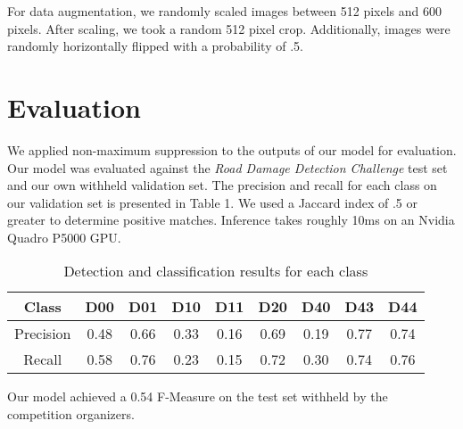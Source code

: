 \documentclass[conference]{IEEEtran}
\begin{document}
For data augmentation, we randomly scaled images between 512 pixels and 600 pixels. After scaling, we took a random 512 pixel crop. Additionally, images were randomly horizontally flipped with a probability of .5.

\section{Evaluation}
We applied non-maximum suppression to the outputs of our model for evaluation. Our model was evaluated against the \textit{Road Damage Detection Challenge} test set and our own withheld validation set. The precision and recall for each class on our validation set is presented in Table 1. We used a Jaccard index of .5 or greater to determine positive matches. Inference takes roughly 10ms on an Nvidia Quadro P5000 GPU.

\begin{table}
\caption{Detection and classification results for each class}
\centering
\begin{tabular}{ccccccccc}
\hline
\textbf{Class} & \textbf{D00} & \textbf{D01} & \textbf{D10} & \textbf{D11} & \textbf{D20} & \textbf{D40} & \textbf{D43} & \textbf{D44} \\
\hline
Precision & 0.48 & 0.66 & 0.33 & 0.16 & 0.69 & 0.19 & 0.77 & 0.74 \\
Recall 	  & 0.58 & 0.76 & 0.23 & 0.15 & 0.72 & 0.30 & 0.74 & 0.76 \\
\hline
\end{tabular}{}
\label{result}
\end{table}

Our model achieved a 0.54 F-Measure on the test set withheld by the competition organizers. 



\nocite{*}
\printbibliography
\end{document}
